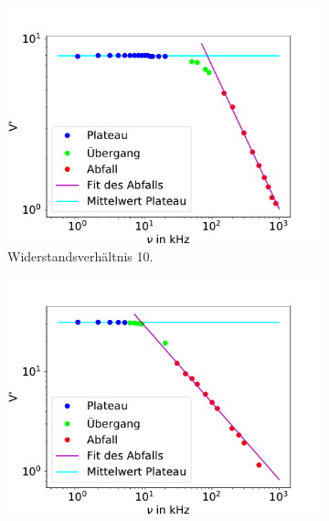                 \begin{figure}
                    \centering
                    \begin{subfigure}{0.48\textwidth}
                        \centering
                        \includegraphics[width=\textwidth]{verhaeltnis1.pdf}%
                        \caption{Widerstandsverhältnis 10.}
                        \label{fig:pep2}
                    \end{subfigure}
                    \begin{subfigure}{0.48\textwidth}
                        \centering
                        \includegraphics[width=\textwidth]{verhaeltnis2.pdf}%

\end{subfigure}
\end{figure}
